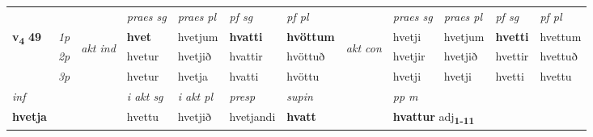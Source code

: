 \begin{longtable}[l]{X>{\footnotesize\itshape}llXXXXlXXXX}
 & &   & \textit{praes sg}  & \textit{praes pl}    & \textit{ pf sg} & \textit{pf pl} & & \textit{praes sg}  & \textit{praes pl}    & \textit{pf sg} & \textit{pf pl }  \\ \cmidrule{4-7} \cmidrule{9-12}
 \multirow{2}{*}{{{\textbf{v{\textsubscript{4}}} \Large{\textbf{49}}}}}  & 1p & \multirow{3}{*}{\begin{turn}{90}\textit{akt ind}\end{turn}} & \textbf{hvet} & hvetjum & \textbf{hvatti} & \textbf{hvöttum} & \multirow{3}{*}{\begin{turn}{90}\textit{akt con}\end{turn}} &hvetji & hvetjum & \textbf{hvetti} & hvettum\\*
 & 2p &  &  hvetur  & hvetjið & hvattir & hvöttuð & & hvetjir & hvetjið & hvettir & hvettuð \\*
 & 3p &  & hvetur & hvetja & hvatti & hvöttu & & hvetji & hvetji& hvetti & hvettu \\*
\cmidrule{4-7} \cmidrule{9-12}

   {\textit{inf}} & &  & \textit{i akt sg} & \textit{i akt pl}   & \textit{presp} & \textit{supin}  && \textit{pp m} \\*
  {\textbf{hvetja}} & && hvettu  & hvetjið   & hvetjandi &  \textbf{hvatt}  && \multicolumn{2}{l}{\textbf{hvattur} adj\textbf{\textsubscript{1-11}}} \\*

\midrule


\end{longtable}
